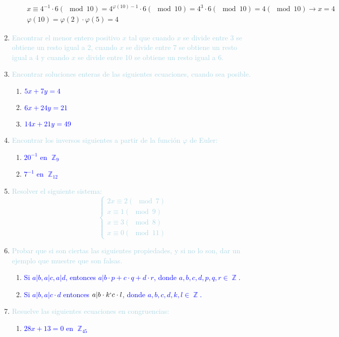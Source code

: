 \documentclass[12pt]{article}
\newcommand{\lb}[1]{\textcolor{lightblue}{#1}}
\newcommand{\db}[1]{\textcolor{blue}{#1}}
\DeclareMathOperator{\Z}{\mathbb{Z}}
\begin{document}
\begin{enumerate}[label=\color{red}\textbf{\arabic*)}, leftmargin=*]
\begin{enumerate}[label=\color{red}\alph*)]
		$\begin{array}{l}
			x\equiv4^{-1}\cdot6(\mod10)=4^{\varphi(10)-1}\cdot6(\mod10)=4^3\cdot6(\mod10)=4(\mod10)\longrightarrow x=4\\
			\varphi(10)=\varphi(2)\cdot\varphi(5)=4
		\end{array}$
	\end{enumerate}
	\item \lb{Encontrar el menor entero positivo $x$ tal que cuando $x$ se divide entre 3 se obtiene un resto igual a 2, cuando $x$ se divide entre 7 se obtiene un resto igual a 4 y cuando $x$ se divide entre 10 se obtiene un resto igual a 6.}
	\item \lb{Encontrar soluciones enteras de las siguientes ecuaciones, cuando sea posible.}
	\begin{enumerate}[label=\color{red}\alph*)]
		\item $\db{5x+7y=4}$
		\item $\db{6x+24y=21}$
		\item $\db{14x+21y=49}$
	\end{enumerate}
	\item \lb{Encontrar los inversos siguientes a partir de la función $\varphi$ de Euler:}
	\begin{enumerate}[label=\color{red}\alph*)]
		\item \db{$20^{-1}$ en $\Z_9$}
		\item \db{$7^{-1}$ en $\Z_{12}$}
	\end{enumerate}
	\item \lb{Resolver el siguiente sistema:\[ \begin{cases}
			2x\equiv2(\mod 7)\\
			x\equiv 1(\mod9)\\
			x\equiv3(\mod 8)\\
			x\equiv0(\mod11)
		\end{cases} \]}
	
	\item \lb{Probar que si son ciertas las siguientes propiedades, y si no lo son, dar un ejemplo que muestre que son falsas.}
	\begin{enumerate}[label=\color{red}\alph*)]
		\item \db{Si $a|b,a|c,a|d$, entonces $a|b\cdot p+c\cdot q+d\cdot r$, donde $a,b,c,d,p,q,r\in\Z$.}
		\item \db{Si $a|b,a|c\cdot d$ entonces $a|b\cdot k`c\cdot l$, donde $a,b,c,d,k,l\in\Z$.}
	\end{enumerate}
	\item \lb{Resuelve las siguientes ecuaciones en congruencias:}
	\begin{enumerate}[label=\color{red}\alph*)]
		\item \db{$28x+13=0$ en $\Z_{45}$}
		

\end{enumerate}
\end{enumerate}
\end{document}
